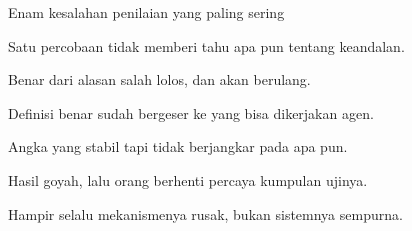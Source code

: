 \documentclass[aspectratio=169,11pt,t]{beamer}
\begin{document}
\begin{frame}[shrink=25]{Enam kesalahan penilaian yang paling sering}
\begin{minipage}[t]{0.3253\textwidth}
\begin{icardbad}
Satu percobaan tidak memberi tahu apa pun tentang keandalan.
\end{icardbad}
\end{minipage}%
\hfill
\begin{minipage}[t]{0.3253\textwidth}
\begin{icardbad}
Benar dari alasan salah lolos, dan akan berulang.
\end{icardbad}
\end{minipage}%
\hfill
\begin{minipage}[t]{0.3253\textwidth}
\begin{icardbad}
Definisi benar sudah bergeser ke yang bisa dikerjakan agen.
\end{icardbad}
\end{minipage}%


\vskip 4pt

\begin{minipage}[t]{0.3253\textwidth}
\begin{icardbad}
Angka yang stabil tapi tidak berjangkar pada apa pun.
\end{icardbad}
\end{minipage}%
\hfill
\begin{minipage}[t]{0.3253\textwidth}
\begin{icardbad}
Hasil goyah, lalu orang berhenti percaya kumpulan ujinya.
\end{icardbad}
\end{minipage}%
\hfill
\begin{minipage}[t]{0.3253\textwidth}
\begin{icardbad}
Hampir selalu mekanismenya rusak, bukan sistemnya sempurna.
\end{icardbad}
\end{minipage}%
\end{frame}

\end{document}
